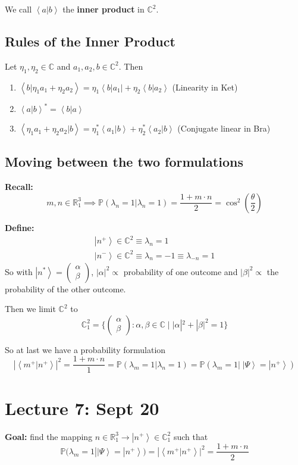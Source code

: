 \documentclass[12pt]{article}
\renewcommand{\P}{\mathbb{P}}
\newcommand{\R}{\mathbb{R}}
\newcommand{\brak}[1]{\left\langle #1 \right\rangle}
\newcommand{\C}{\mathbb{C}}
\newcommand{\bra}[1]{\left\langle #1 \right\vert }
\newcommand{\ket}[1]{\left\vert #1 \right\rangle}
\begin{document}
We call $\brak{a | b}$ the \textbf{inner product} in $\C^2$.

\subsection*{Rules of the Inner Product}
Let $\eta_1, \eta_2 \in \C$ and $a_1, a_2, b \in \C^2$. Then
\begin{enumerate}
    \item $\brak{b | \eta_1 a_1 + \eta_2 a_2} = \eta_1 \bra{b | a_1} + \eta_2 \brak{b | a_2}$ (Linearity in Ket)
    \item $\brak{a | b}^* = \brak{b | a}$
    \item $\brak{\eta_1 a_1 + \eta_2 a_2 | b} = \eta_1^* \brak{a_1 | b} + \eta_2^* \brak{a_2 | b}$ (Conjugate linear in Bra)
\end{enumerate}

\subsection*{Moving between the two formulations}
\textbf{Recall:}
\[m, n \in \R_1^3 \implies \P(\lambda_n = 1 | \lambda_n = 1) = \frac{1+m\cdot n}{2} = \cos^2(\frac{\theta}{2})\]

\textbf{Define:}
\begin{align*}
    \ket{n^+} \in \C^2 \equiv \lambda_n = 1\\
    \ket{n^-} \in \C^2 \equiv \lambda_n = -1 \equiv \lambda_{-n} = 1
\end{align*}
So with $\ket{n^*} = \begin{pmatrix}
    \alpha\\\beta
\end{pmatrix}$, $|\alpha|^2 \propto$ probability of one outcome and $|\beta|^2 \propto$ the probability of the other outcome. 

Then we limit $\C^2$ to 
\[\C^2_1 = \{\begin{pmatrix} \alpha\\\beta \end{pmatrix}: \alpha, \beta \in \C \; | \; |\alpha|^2 + |\beta|^2 = 1\}\]

So at last we have a probability formulation 
\[|\brak{m^+ | n^+}|^2 = \frac{1 + m\cdot n}{1} = \P(\lambda_m = 1 | \lambda_n = 1) = \P(\lambda_m = 1 |\; \ket{\Psi} = \ket{n^+})\]

\section*{Lecture 7: Sept 20}
\textbf{Goal:} find the mapping $n \in \R_1^3 \to \ket{n^+} \in \C_1^2$ such that 
\[\P(\lambda_m = 1 | \ket{\Psi} = \ket{n^+}) = |\brak{m^+ | n^+}|^2 = \frac{1 + m\cdot n}{2}\]
\end{document}
